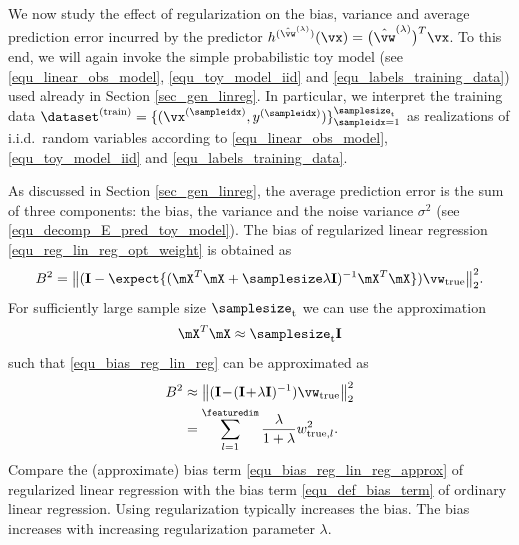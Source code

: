 \documentclass[12pt]{report}
\begin{document}
We now study the effect of regularization on the bias, variance 
and average prediction error incurred by the predictor $h^{(\hat{\vw}^{(\lambda)})}(\vx) = \big(\hat{\vw}^{(\lambda)}\big)^{T} \vx$. 
To this end, we will again invoke the simple probabilistic toy 
model (see \eqref{equ_linear_obs_model}, \eqref{equ_toy_model_iid} 
and \eqref{equ_labels_training_data}) used already in Section \ref{sec_gen_linreg}. 
In particular, we interpret the training data $\dataset^{(\rm train)} = \{ (\vx^{(\sampleidx)},y^{(\sampleidx)}) \}_{\sampleidx=1}^{\samplesize_{\rm t}}$ 
as realizations of i.i.d.\ random variables according to \eqref{equ_linear_obs_model}, 
\eqref{equ_toy_model_iid} and \eqref{equ_labels_training_data}. 

As discussed in Section \ref{sec_gen_linreg}, the average prediction 
error is the sum of three components: the bias, the variance and the 
noise variance $\sigma^{2}$ (see \eqref{equ_decomp_E_pred_toy_model}). 
The bias of regularized linear regression \eqref{equ_reg_lin_reg_opt_weight} 
is obtained as 
\begin{equation} 
\label{equ_bias_reg_lin_reg}
B^{2} = \big \| (\mathbf{I} - \expect \{ ( \mX^{T} \mX +  \samplesize \lambda \mathbf{I})^{-1} \mX^{T} \mX  \})  \vw_{\rm true} \big  \|^{2}_{2}. 
\end{equation} 
For sufficiently large sample size $\samplesize_{\rm t}$ we can use the approximation 
\begin{equation} 
\label{equ_approx_Gram_large_N}
\mX^{T} \mX  \approx \samplesize_{\rm t} \mathbf{I} 
\end{equation} 
such that \eqref{equ_bias_reg_lin_reg} can be approximated as 
 \begin{align} 
\label{equ_bias_reg_lin_reg_approx}
B^{2} & \approx \big \| (\mathbf{I}\!-\!(\mathbf{I}\!+\!\lambda \mathbf{I})^{-1} ) \vw_{\rm true} \big  \|^{2}_{2} \nonumber \\
& =  \sum_{l=1}^{\featuredim} \frac{\lambda}{1+\lambda} w_{{\rm true},l}^2 .
\end{align} 
Compare the (approximate) bias term \eqref{equ_bias_reg_lin_reg_approx} 
of regularized linear regression with the bias term \eqref{equ_def_bias_term} of 
ordinary linear regression. Using regularization typically increases the bias. 
The bias increases with increasing regularization parameter $\lambda$. 
\end{document}
